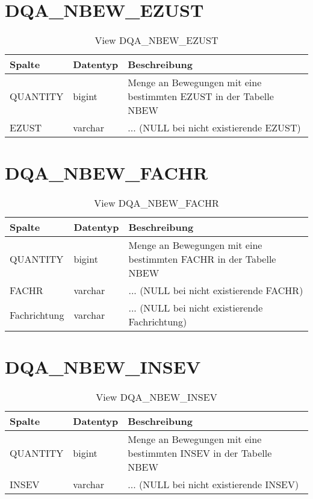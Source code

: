   \section{DQA\_NBEW\_EZUST}

  \begin{table}[ht]
    \centering
    \caption{View DQA\_NBEW\_EZUST}
    \label{tab:dqanbewezust}
    \begin{tabular}{||l|l|p{10cm}||}
      \hline
      Spalte & Datentyp & Beschreibung \\ [0.5ex] \hline \hline
QUANTITY & bigint & Menge an Bewegungen mit eine bestimmten EZUST in der Tabelle NBEW \\ \hline
EZUST & varchar & ... (NULL bei nicht existierende EZUST)\\ \hline
    \end{tabular}
  \end{table}
 \clearpage
  \section{DQA\_NBEW\_FACHR}

  \begin{table}[ht]
    \centering
    \caption{View DQA\_NBEW\_FACHR}
    \label{tab:dqanbewfachr}
    \begin{tabular}{||l|l|p{10cm}||}
      \hline
      Spalte & Datentyp & Beschreibung \\ [0.5ex] \hline \hline
QUANTITY & bigint & Menge an Bewegungen mit eine bestimmten FACHR in der Tabelle NBEW \\ \hline
FACHR & varchar & ... (NULL bei nicht existierende FACHR)\\ \hline
Fachrichtung & varchar & ... (NULL bei nicht existierende Fachrichtung)\\ \hline
    \end{tabular}
  \end{table}
 \clearpage
  \section{DQA\_NBEW\_INSEV}

  \begin{table}[ht]
    \centering
    \caption{View DQA\_NBEW\_INSEV}
    \label{tab:dqanbewinsev}
    \begin{tabular}{||l|l|p{10cm}||}
      \hline
      Spalte & Datentyp & Beschreibung \\ [0.5ex] \hline \hline
QUANTITY & bigint & Menge an Bewegungen mit eine bestimmten INSEV in der Tabelle NBEW \\ \hline
INSEV & varchar & ... (NULL bei nicht existierende INSEV)\\ \hline
    \end{tabular}
  \end{table}
 \clearpage

